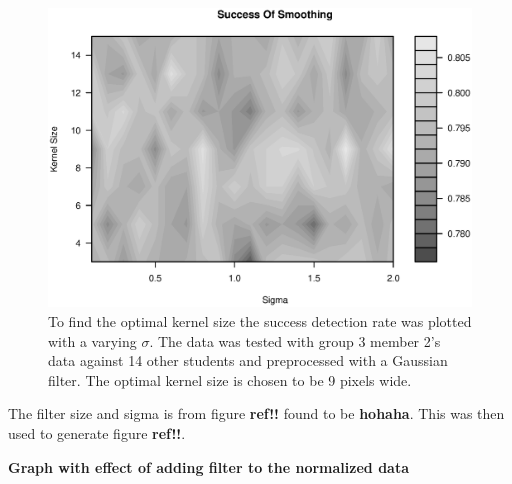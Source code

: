 \begin{figure}
\centering
\includegraphics[width = \textwidth]{graphics/success_of_smoothing_contour}
\caption{To find the optimal kernel size the success detection rate was plotted with a varying $\sigma$.
The data was tested with group 3 member 2's data against 14 other students and preprocessed with a Gaussian filter. 
The optimal kernel size is chosen to be 9 pixels wide.
}
\end{figure}

The filter size and sigma is from figure \textbf{ref!!} found to be \textbf{hohaha}.
This was then used to generate figure \textbf{ref!!}.

\textbf{Graph with effect of adding filter to the normalized data}


